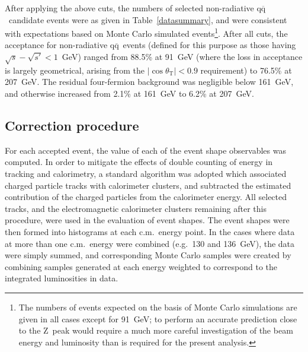 \documentclass[12pt,a4paper,twoside]{article}
\newcommand{\qqbar}  {\ensuremath{\mathrm{q\overline{q}}}}
\newcommand{\zzero}  {\ensuremath{\mathrm{Z}}}
\begin{document}
After applying the above cuts, the numbers of selected non-radiative
\qqbar\ candidate events 
were as given in Table~\ref{datasummary}, and 
were consistent with expectations based on Monte Carlo 
simulated events\footnote{The numbers of events expected on the basis 
of Monte Carlo simulations
are given in all cases except for 91~GeV; to perform an accurate
prediction close to the \zzero\ peak would require a much more 
careful investigation of the beam energy and luminosity 
than is required for the present analysis.}.
After all cuts, the acceptance for non-radiative 
\qqbar\ events (defined for this 
purpose as those having $\sqrt{s}-\sqrt{s'}<1$~GeV) 
ranged from
88.5\% at 91~GeV (where the loss in acceptance is largely geometrical, 
arising from the $|\cos\theta_{\mathrm{T}}|<0.9$ requirement) to 
76.5\% at 207~GeV.  The residual four-fermion background was 
negligible below 161~GeV, and otherwise increased from 2.1\% at 161~GeV
to 6.2\% at 207~GeV.

\subsection{ Correction procedure }
\label{sec-corrproc}
For each accepted event, the value of each of the event shape observables
was computed.  In order to mitigate the effects of double counting of 
energy in tracking and calorimetry, 
a standard algorithm was adopted
which associated charged particle tracks with calorimeter clusters, and 
subtracted the estimated contribution of the charged particles from the 
calorimeter energy.  All selected tracks, and the electromagnetic
calorimeter clusters remaining after this procedure, were used in the 
evaluation of event shapes.  The event shapes were then formed into
histograms at each c.m.\ energy point.    In the cases
where data at more than
one c.m.\ energy were combined (e.g.\ 130 and 136~GeV), the data were simply 
summed, and corresponding Monte Carlo samples were created by combining 
samples generated at each energy weighted to correspond to the
integrated luminosities in data.
\end{document}
